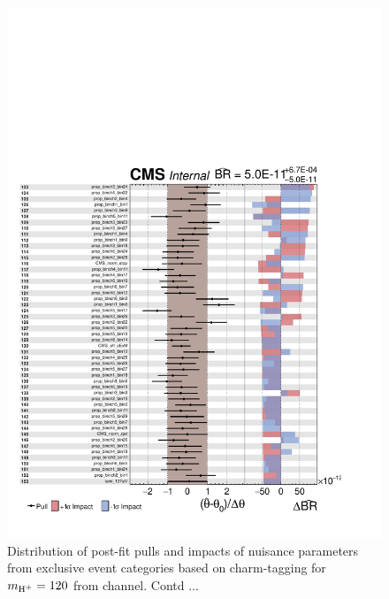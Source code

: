 \begin{figure}
\begin{center}
\includegraphics[width=1.0\textwidth]{Image/MLFit/ImpactNuis/nuisImpact3.pdf}
 \caption{Distribution of post-fit pulls and impacts of nuisance parameters from
     exclusive event categories based on charm-tagging for $m_{\text{H}^+}=120$
     \GeV from \ljets channel. Contd ...}
\label{fig:nuisImpact3}
\end{center}
\end{figure}

